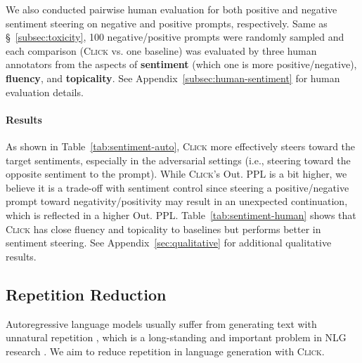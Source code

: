 We also conducted pairwise human evaluation for both positive and negative sentiment steering on negative and positive prompts, respectively. Same as \S~\ref{subsec:toxicity}, 100 negative/positive prompts were randomly sampled and each comparison (\textsc{Click} vs. one baseline) was evaluated by three human annotators from the aspects of \textbf{sentiment} (which one is more positive/negative), \textbf{fluency}, and \textbf{topicality}.
See Appendix~\ref{subsec:human-sentiment} for human evaluation details.

\paragraph{Results}
As shown in Table~\ref{tab:sentiment-auto}, \textsc{Click} more effectively steers toward the target sentiments, especially in the adversarial settings (i.e., steering toward the opposite sentiment to the prompt). While \textsc{Click}'s Out. PPL is a bit higher, we believe it is a trade-off with sentiment control since steering a positive/negative prompt toward negativity/positivity may result in an unexpected continuation, which is reflected in a higher Out. PPL.
Table~\ref{tab:sentiment-human} shows that \textsc{Click} has close fluency and topicality to baselines but performs better in sentiment steering. See Appendix~\ref{sec:qualitative} for additional qualitative results.

\subsection{Repetition Reduction}
\label{subsec:repetition}

Autoregressive language models usually suffer from generating text with unnatural repetition \cite{topp}, which is a long-standing and important problem in NLG research \cite{unlikelihood, contrastive-token}. We aim to reduce repetition in language generation with \textsc{Click}.

